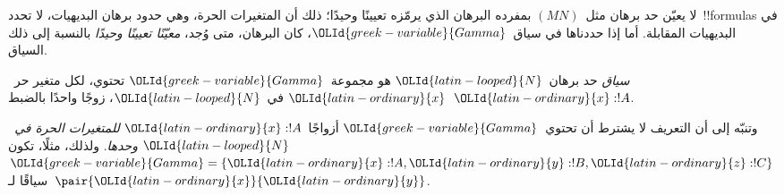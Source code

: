 \documentclass[../../../include/open-logic-section]{subfiles}
\begin{document}


لا يعيّن حد برهان مثل~$(MN)$ بمفرده البرهان الذي يرمّزه تعيينًا وحيدًا؛
ذلك أن المتغيرات الحرة، وهي حدود برهان البديهيات، لا تحدد~!!{formula}s في
البديهيات المقابلة. أما إذا حددناها في سياق~${\OLId{greek-variable}{Gamma}}$، كان البرهان، متى
وُجد، \emph{معيّنًا تعيينًا وحيدًا} بالنسبة إلى ذلك السياق.

\begin{defn}
\emph{سياق} حد برهان~${\OLId{latin-looped}{N}}$ هو مجموعة~${\OLId{greek-variable}{Gamma}}$ تحتوي، لكل متغير حر~${\OLId{latin-ordinary}{x}}$ في~${\OLId{latin-looped}{N}}$،
زوجًا واحدًا بالضبط~${\OLId{latin-ordinary}{x}}:!A$.
\end{defn}

وتنبّه إلى أن التعريف لا يشترط أن تحتوي~${\OLId{greek-variable}{Gamma}}$ أزواجًا~${\OLId{latin-ordinary}{x}}:!A$
\emph{للمتغيرات الحرة في~${\OLId{latin-looped}{N}}$ وحدها}. ولذلك، مثلًا، تكون
${\OLId{greek-variable}{Gamma}}=\{{\OLId{latin-ordinary}{x}}:!A,{\OLId{latin-ordinary}{y}}:!B,{\OLId{latin-ordinary}{z}}:!C\}$ سياقًا لـ~$\pair{{\OLId{latin-ordinary}{x}}}{{\OLId{latin-ordinary}{y}}}$.
\end{document}

